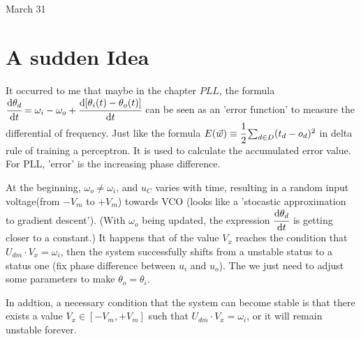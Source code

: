 \univlogo

{\Huge March 31}\vspace{5mm}

\section*{A sudden Idea}

It occurred to me that maybe in the chapter $PLL$, the formula $\cfrac{\mathrm{d} \theta_d}{\mathrm{d} t}=\omega_i-\omega_o+\cfrac{\mathrm{d} [\theta_i(t)-\theta_o(t)]}{\mathrm{d} t}$ can be seen as an 'error function' to measure the differential of frequency. Just like the formula $E(\vec{w})\equiv\cfrac{1}{2}\sum_{d\in D}(t_d-o_d)^2$ in delta rule of training a perceptron. It is used to calculate the accumulated error value. For PLL, 'error' is the increasing phase difference.

At the beginning, $\omega_o \ne \omega_i$, and $u_C$ varies with time, resulting in a random input voltage(from $-V_{m}$  to $+V_{m}$) towards VCO (looks like a 'stocastic approximation to gradient descent'). (With $\omega_o$ being updated, the expression $\cfrac{\mathrm{d} \theta_d}{\mathrm{d} t}$ is getting closer to a constant.) It happens that of the value $V_x$ reaches the condition that $U_{dm}\cdot V_x = \omega_i$, then the system successfully shifts from a unstable status to a status one (fix phase difference between $u_i$ and $u_o$). The we just need to adjust some parameters to make $\theta_o = \theta_i$.

In addtion, a necessary condition that the system can become stable is that there exists a value $V_x\in [-V_m,+V_m]$ such that $U_{dm}\cdot V_x = \omega_i$, or it will remain unstable forever.



